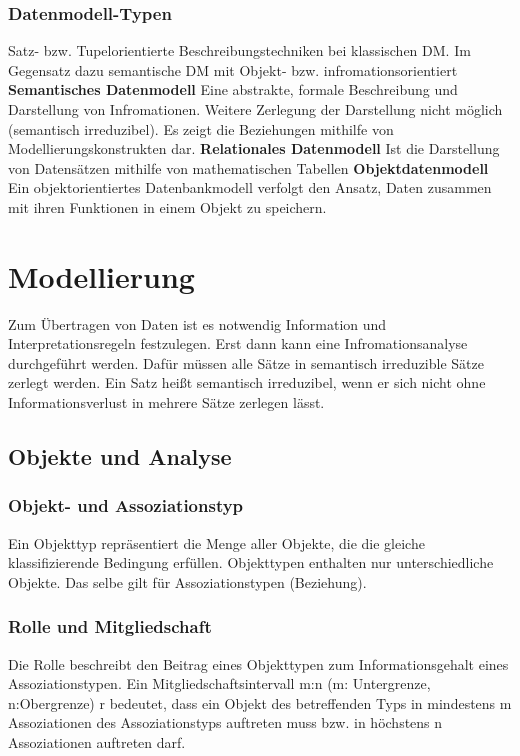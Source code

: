 \documentclass[a4paper,10pt]{scrartcl}
\begin{document}
\subsubsection{Datenmodell-Typen} 
Satz- bzw. Tupelorientierte Beschreibungstechniken bei klassischen DM.\newline
Im Gegensatz dazu semantische DM mit Objekt- bzw. infromationsorientiert
\newline\textbf{Semantisches Datenmodell}\newline
Eine abstrakte, formale Beschreibung und Darstellung von Infromationen. Weitere Zerlegung der Darstellung nicht möglich (semantisch irreduzibel). Es zeigt die Beziehungen mithilfe von Modellierungskonstrukten dar.
\newline\textbf{Relationales Datenmodell} \newline
Ist die Darstellung von Datensätzen mithilfe von mathematischen Tabellen
\newline\textbf{Objektdatenmodell}\newline
Ein objektorientiertes Datenbankmodell verfolgt den Ansatz, Daten zusammen mit ihren Funktionen in einem Objekt zu speichern.
\newpage
\section{Modellierung}
Zum Übertragen von Daten ist es notwendig Information und Interpretationsregeln festzulegen. Erst dann kann eine Infromationsanalyse durchgeführt werden. Dafür müssen alle Sätze in semantisch irreduzible Sätze zerlegt werden. Ein Satz heißt semantisch irreduzibel, wenn er sich nicht ohne Informationsverlust in mehrere Sätze zerlegen lässt.
\subsection{Objekte und Analyse}
\subsubsection{Objekt- und Assoziationstyp}
Ein Objekttyp repräsentiert die Menge aller Objekte, die die gleiche klassifizierende Bedingung erfüllen. 
Objekttypen enthalten nur unterschiedliche Objekte. Das selbe gilt für Assoziationstypen (Beziehung).
\subsubsection{Rolle und Mitgliedschaft}
Die Rolle beschreibt den Beitrag eines Objekttypen zum Informationsgehalt eines Assoziationstypen. Ein Mitgliedschaftsintervall m:n (m: Untergrenze, n:Obergrenze) r bedeutet, dass ein Objekt des betreffenden Typs in mindestens m Assoziationen des Assoziationstyps auftreten muss bzw. in höchstens n Assoziationen auftreten darf.
\end{document}
